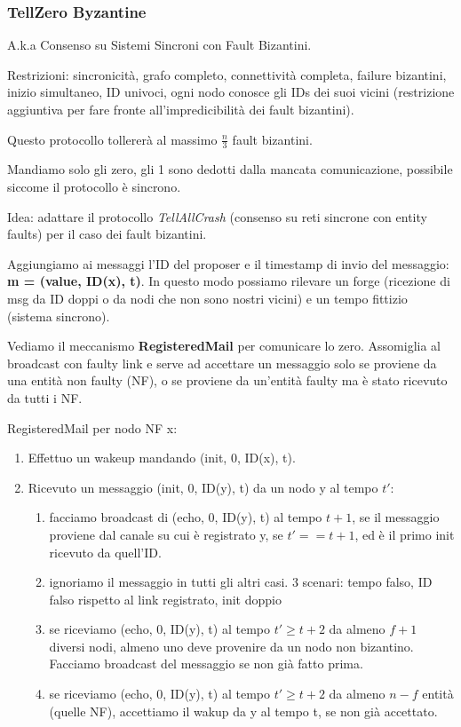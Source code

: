 \subsubsection{TellZero Byzantine}
A.k.a Consenso su Sistemi Sincroni con Fault Bizantini.

Restrizioni: sincronicità, grafo completo, connettività completa, failure bizantini, inizio simultaneo, ID univoci, ogni nodo conosce gli IDs
dei suoi vicini (restrizione aggiuntiva per fare fronte all'impredicibilità dei fault bizantini).

Questo protocollo tollererà al massimo $\frac{n}{3}$ fault bizantini.

Mandiamo solo gli zero, gli 1 sono dedotti dalla mancata comunicazione, possibile siccome il protocollo è sincrono.

Idea: adattare il protocollo \textit{TellAllCrash} (consenso su reti sincrone con entity faults) per il caso dei fault bizantini.

Aggiungiamo ai messaggi l'ID del proposer e il timestamp di invio del messaggio: \textbf{m = (value, ID(x), t)}.
In questo modo possiamo rilevare un forge (ricezione di msg da ID doppi o da nodi che non sono nostri vicini) e un tempo fittizio (sistema sincrono).


Vediamo il meccanismo \textbf{RegisteredMail} per comunicare lo zero. Assomiglia al broadcast con faulty link e serve ad accettare un messaggio
solo se proviene da una entità non faulty (NF), o se proviene da un'entità faulty ma è stato ricevuto da tutti i NF.

RegisteredMail per nodo NF x:\\
\begin{enumerate}
  \item Effettuo un wakeup mandando (init, 0, ID(x), t). \\
  \item Ricevuto un messaggio (init, 0, ID(y), t) da un nodo y al tempo $t'$:
  \begin{enumerate}
    \item facciamo broadcast di (echo, 0, ID(y), t) al tempo $t+1$, se il messaggio proviene dal canale su cui è registrato y, se $t' == t+1$, ed è il primo init ricevuto da quell'ID.
    \item ignoriamo il messaggio in tutti gli altri casi. 3 scenari: tempo falso, ID falso rispetto al link registrato, init doppio
    \item se riceviamo (echo, 0, ID(y), t) al tempo $t' \geq t+2$ da almeno $f+1$ diversi nodi, almeno uno deve provenire da un nodo non bizantino.
    Facciamo broadcast del messaggio se non già fatto prima.
    \item se riceviamo (echo, 0, ID(y), t) al tempo $t' \geq t+2$ da almeno $n-f$ entità (quelle NF), accettiamo il wakup da y al tempo t,
    se non già accettato.
  \end{enumerate}
\end{enumerate}


